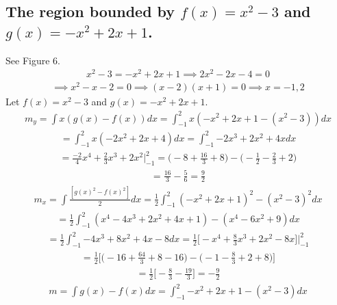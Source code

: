 \documentclass{article}
\begin{document}
\subsection{The region bounded by $f(x) = x^2 - 3$ and $g(x) = -x^2 + 2x + 1$.}
See Figure 6. 
\begin{align*}
	x^2 - 3 = -x^2 + 2x + 1 \implies 2x^2 - 2x - 4 = 0
\end{align*}
\begin{align*}
	\implies x^2 - x - 2 = 0 \implies (x - 2)(x + 1) = 0 \implies x = -1, 2
\end{align*}
Let $f(x) = x^2 - 3$ and $g(x) = -x^2 + 2x + 1$.
\begin{align*}
	m_y = \int {x(g(x) - f(x))}dx = \int_{-1}^2 {x(-x^2 + 2x + 1 - (x^2 - 3))}dx
\end{align*}
\begin{align*}
	= \int_{-1}^2 {x(-2x^2 + 2x + 4)}dx = \int_{-1}^2 {-2x^3 + 2x^2 + 4x}dx
\end{align*}
\begin{align*}
	= \frac{-2}{4}x^4 + \frac{2}{3}x^3 + 2x^2 \bigg|_{-1}^2 = \bigg( -8 + \frac{16}{3} + 8 \bigg) - \bigg( -\frac{1}{2} - \frac{2}{3} + 2 \bigg)
\end{align*}
\begin{align*}
	= \frac{16}{3} - \frac{5}{6} = \frac{9}{2}
\end{align*}
\begin{align*}
	m_x = \int {\frac{[g(x)^2 - f(x)^2]}{2}}dx = \frac{1}{2} \int_{-1}^2 {(-x^2 + 2x + 1)^2 - (x^2 - 3)^2}dx
\end{align*}
\begin{align*}
	= \frac{1}{2} \int_{-1}^2 {(x^4 - 4x^3 + 2x^2 + 4x + 1) - (x^4 - 6x^2 + 9)}dx
\end{align*}
\begin{align*}
	= \frac{1}{2} \int_{-1}^2 {-4x^3 + 8x^2 + 4x - 8}dx = \frac{1}{2} \bigg[ -x^4 + \frac{8}{3}x^3 + 2x^2 - 8x \bigg] \bigg|_{-1}^2
\end{align*}
\begin{align*}
	= \frac{1}{2} \bigg[ \bigg( -16 + \frac{64}{3} + 8 - 16 \bigg) - \bigg( -1 - \frac{8}{3} + 2 + 8 \bigg) \bigg]
\end{align*}
\begin{align*}
	= \frac{1}{2} \bigg[ -\frac{8}{3} - \frac{19}{3} \bigg] = - \frac{9}{2}
\end{align*}
\begin{align*}
	m = \int {g(x) - f(x)}dx = \int_{-1}^2 {-x^2 + 2x + 1 - (x^2 - 3)}dx
\end{align*}
\end{document}
